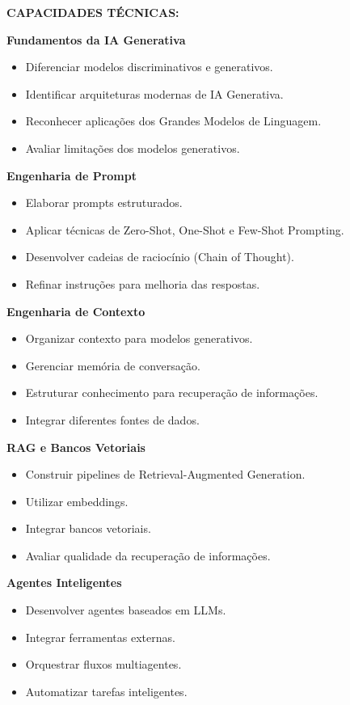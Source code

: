 \textbf{CAPACIDADES TÉCNICAS:}

\textbf{Fundamentos da IA Generativa}

\begin{itemize}
\item Diferenciar modelos discriminativos e generativos.
\item Identificar arquiteturas modernas de IA Generativa.
\item Reconhecer aplicações dos Grandes Modelos de Linguagem.
\item Avaliar limitações dos modelos generativos.
\end{itemize}

\textbf{Engenharia de Prompt}

\begin{itemize}
\item Elaborar prompts estruturados.
\item Aplicar técnicas de Zero-Shot, One-Shot e Few-Shot Prompting.
\item Desenvolver cadeias de raciocínio (Chain of Thought).
\item Refinar instruções para melhoria das respostas.
\end{itemize}

\textbf{Engenharia de Contexto}

\begin{itemize}
\item Organizar contexto para modelos generativos.
\item Gerenciar memória de conversação.
\item Estruturar conhecimento para recuperação de informações.
\item Integrar diferentes fontes de dados.
\end{itemize}

\textbf{RAG e Bancos Vetoriais}

\begin{itemize}
\item Construir pipelines de Retrieval-Augmented Generation.
\item Utilizar embeddings.
\item Integrar bancos vetoriais.
\item Avaliar qualidade da recuperação de informações.
\end{itemize}

\textbf{Agentes Inteligentes}

\begin{itemize}
\item Desenvolver agentes baseados em LLMs.
\item Integrar ferramentas externas.
\item Orquestrar fluxos multiagentes.
\item Automatizar tarefas inteligentes.
\end{itemize}

